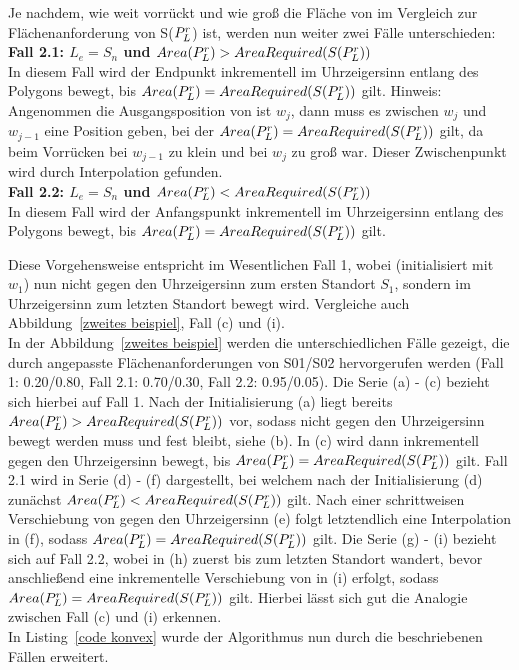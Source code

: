 \documentclass[ngerman]{seminarbeitrag}
\begin{document}
Je nachdem, wie weit \Le vorrückt und wie groß die Fläche von \prl im Vergleich zur Flächenanforderung von S($P_{L}^{r}$) ist, werden nun weiter zwei Fälle unterschieden:\\

\textbf{Fall 2.1: $L_{e} = S_{n}$ und $Area(P_{L}^{r})>AreaRequired(S(P_{L}^{r}))$} \\
In diesem Fall wird der Endpunkt \Le inkrementell im Uhrzeigersinn entlang des Polygons bewegt, bis $Area(P_{L}^{r})=AreaRequired(S(P_{L}^{r}))$ gilt.
Hinweis: Angenommen die Ausgangsposition von \Le ist $w_{j}$, dann muss es zwischen $w_{j}$ und $w_{j-1}$ eine Position geben, bei der $Area(P_{L}^{r})=AreaRequired(S(P_{L}^{r}))$ gilt, da beim Vorrücken \ar{\mprl} bei $w_{j-1}$ zu klein und bei $w_{j}$ zu groß war. Dieser Zwischenpunkt wird durch Interpolation gefunden.\\

\textbf{Fall 2.2: $L_{e} = S_{n}$ und $Area(P_{L}^{r})<AreaRequired(S(P_{L}^{r}))$} \\
In diesem Fall wird der Anfangspunkt \ls inkrementell im Uhrzeigersinn entlang des Polygons bewegt, bis $Area(P_{L}^{r})=AreaRequired(S(P_{L}^{r}))$ gilt.

Diese Vorgehensweise entspricht im Wesentlichen Fall 1, wobei \ls (initialisiert mit $w_{1}$) nun nicht gegen den Uhrzeigersinn zum ersten Standort $S_{1}$, sondern im Uhrzeigersinn zum letzten Standort bewegt wird. Vergleiche auch Abbildung~\ref{zweites beispiel}, Fall (c) und (i).\\

In der Abbildung~\ref{zweites beispiel} werden die unterschiedlichen Fälle gezeigt, die durch angepasste Flächenanforderungen von S01/S02 hervorgerufen werden (Fall 1: 0.20/0.80, Fall 2.1: 0.70/0.30, Fall 2.2: 0.95/0.05). Die Serie (a) - (c) bezieht sich hierbei auf Fall 1. Nach der Initialisierung (a) liegt bereits $Area(P_{L}^{r}) > AreaRequired(S(P_{L}^{r}))$ vor, sodass \Le nicht gegen den Uhrzeigersinn bewegt werden muss und fest bleibt, siehe (b). In (c) wird \ls dann inkrementell gegen den Uhrzeigersinn bewegt, bis $Area(P_{L}^{r})=AreaRequired(S(P_{L}^{r}))$ gilt. Fall 2.1 wird in Serie (d) - (f) dargestellt, bei welchem nach der Initialisierung (d) zunächst $Area(P_{L}^{r}) < AreaRequired(S(P_{L}^{r}))$ gilt. Nach einer schrittweisen Verschiebung von \Le gegen den Uhrzeigersinn (e) folgt letztendlich eine Interpolation in (f), sodass $Area(P_{L}^{r})=AreaRequired(S(P_{L}^{r}))$ gilt. Die Serie (g) - (i) bezieht sich auf Fall 2.2, wobei \Le in (h) zuerst bis zum letzten Standort wandert, bevor anschließend eine inkrementelle Verschiebung von \ls in (i) erfolgt, sodass $Area(P_{L}^{r})=AreaRequired(S(P_{L}^{r}))$ gilt. Hierbei lässt sich gut die Analogie zwischen Fall (c) und (i) erkennen.\\
In Listing~\ref{code konvex} wurde der Algorithmus \con nun durch die beschriebenen Fällen erweitert.
\end{document}

